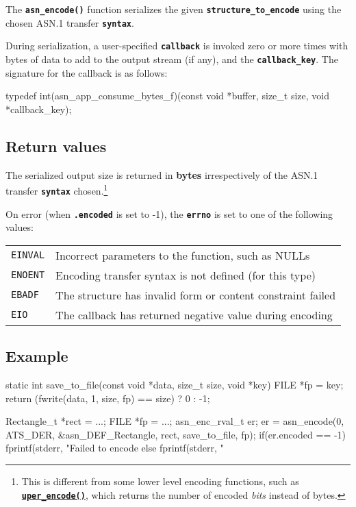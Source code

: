 \documentclass[english,oneside,12pt]{book}
\newcommand{\api}[2]{\hyperref[#1]{\code{#2}}}
\newcommand{\code}[1]{\texttt{\textbf{\lstinline{#1}}}}
\begin{document}
The \code{asn_encode()} function serializes the given \code{structure_to_encode} using the chosen ASN.1 transfer \code{syntax}.

During serialization, a user-specified \code{callback} is invoked zero
or more times with bytes of data to add to the output stream (if any), and
the \code{callback_key}. The signature for the callback is as follows:

\begin{signature}
typedef int(asn_app_consume_bytes_f)(const void *buffer, size_t size, void *callback_key);
\end{signature}

\subsection*{Return values}


The serialized output size is returned in \textbf{bytes} irrespectively of the
ASN.1 transfer \code{syntax} chosen.\footnote{This is different from some
lower level encoding functions, such as \api{sec:uper_encode}{uper_encode()},
which returns the number of encoded \emph{bits} instead of bytes.}

On error (when \code{.encoded} is set to -1),
the \code{errno} is set to one of the following values:

\begin{tabular}[h!]{ll}
\texttt{EINVAL} & Incorrect parameters to the function, such as NULLs \\
\texttt{ENOENT} & Encoding transfer syntax is not defined (for this type) \\
\texttt{EBADF} & The structure has invalid form or content constraint failed \\
\texttt{EIO} & The callback has returned negative value during encoding
\end{tabular}

\subsection*{Example}
\begin{example}
static int
save_to_file(const void *data, size_t size, void *key) {
    FILE *fp = key;
    return (fwrite(data, 1, size, fp) == size) ? 0 : -1;
}

Rectangle_t *rect = ...;
FILE *fp = ...;
asn_enc_rval_t er;
er = asn_encode(0, ATS_DER, &asn_DEF_Rectangle, rect, save_to_file, fp);
if(er.encoded == -1) {
   fprintf(stderr, "Failed to encode %
} else {
   fprintf(stderr, "%
}
\end{example}
\end{document}
